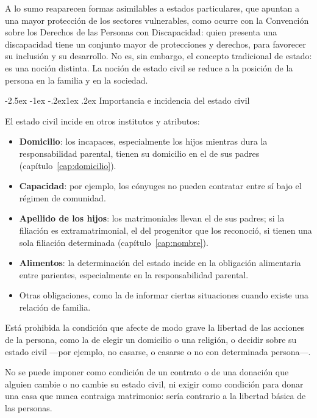 \documentclass[12pt,oneside]{book}
\makeatletter
\renewcommand\subsection{\@startsection{subsection}{2}{\z@}%
  {-2.5ex \@plus -1ex \@minus -.2ex}{1ex \@plus .2ex}%
  {\normalfont\normalsize\bfseries}}
\makeatother
\begin{document}
\begin{importante}
A lo sumo reaparecen formas asimilables a estados particulares, que apuntan a una mayor protección de los sectores vulnerables, como ocurre con la Convención sobre los Derechos de las Personas con Discapacidad: quien presenta una discapacidad tiene un conjunto mayor de protecciones y derechos, para favorecer su inclusión y su desarrollo. No es, sin embargo, el concepto tradicional de estado: es una noción distinta. La noción de estado civil se reduce a la posición de la persona en la familia y en la sociedad.
\end{importante}

\subsection{Importancia e incidencia del estado civil}

El estado civil incide en otros institutos y atributos:

\begin{itemize}
\item \textbf{Domicilio}: los incapaces, especialmente los hijos mientras dura la responsabilidad parental, tienen su domicilio en el de sus padres (capítulo~\ref{cap:domicilio}).
\item \textbf{Capacidad}: por ejemplo, los cónyuges no pueden contratar entre sí bajo el régimen de comunidad.
\item \textbf{Apellido de los hijos}: los matrimoniales llevan el de sus padres; si la filiación es extramatrimonial, el del progenitor que los reconoció, si tienen una sola filiación determinada (capítulo~\ref{cap:nombre}).
\item \textbf{Alimentos}: la determinación del estado incide en la obligación alimentaria entre parientes, especialmente en la responsabilidad parental.
\item Otras obligaciones, como la de informar ciertas situaciones cuando existe una relación de familia.
\end{itemize}

\begin{regla}
Está prohibida la condición que afecte de modo grave la libertad de las acciones de la persona, como la de elegir un domicilio o una religión, o decidir sobre su estado civil ---por ejemplo, no casarse, o casarse o no con determinada persona---.
\end{regla}

No se puede imponer como condición de un contrato o de una donación que alguien cambie o no cambie su estado civil, ni exigir como condición para donar una casa que nunca contraiga matrimonio: sería contrario a la libertad básica de las personas.
\end{document}
